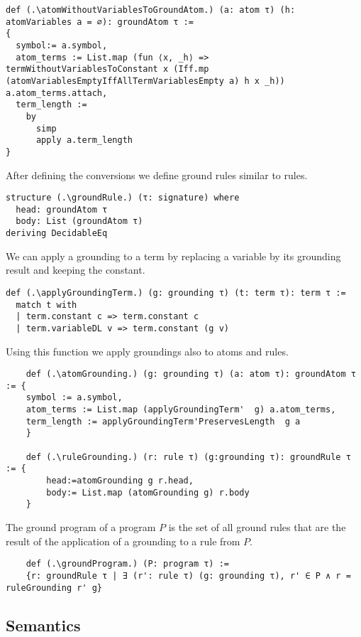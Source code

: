 \begin{lstlisting}
def (.\atomWithoutVariablesToGroundAtom.) (a: atom τ) (h: atomVariables a = ∅): groundAtom τ :=
{
  symbol:= a.symbol,
  atom_terms := List.map (fun ⟨x, _h⟩ => termWithoutVariablesToConstant x (Iff.mp (atomVariablesEmptyIffAllTermVariablesEmpty a) h x _h)) a.atom_terms.attach,
  term_length :=
    by
      simp
      apply a.term_length
}
\end{lstlisting}

After defining the conversions we define ground rules similar to rules.

\begin{lstlisting}
structure (.\groundRule.) (τ: signature) where
  head: groundAtom τ
  body: List (groundAtom τ)
deriving DecidableEq
\end{lstlisting}

We can apply a grounding to a term by replacing a variable by its grounding result and keeping the constant.
\begin{lstlisting}
def (.\applyGroundingTerm.) (g: grounding τ) (t: term τ): term τ :=
  match t with
  | term.constant c => term.constant c
  | term.variableDL v => term.constant (g v)
\end{lstlisting}

Using this function we apply groundings also to atoms and rules. 

\begin{lstlisting}
    def (.\atomGrounding.) (g: grounding τ) (a: atom τ): groundAtom τ := {
    symbol := a.symbol, 
    atom_terms := List.map (applyGroundingTerm'  g) a.atom_terms, 
    term_length := applyGroundingTerm'PreservesLength  g a
    }

    def (.\ruleGrounding.) (r: rule τ) (g:grounding τ): groundRule τ := {
        head:=atomGrounding g r.head, 
        body:= List.map (atomGrounding g) r.body 
    }

\end{lstlisting}

The ground program of a program $P$ is the set of all ground rules that are the result of the application of a grounding to a rule from $P$.

\begin{lstlisting}
    def (.\groundProgram.) (P: program τ) := 
    {r: groundRule τ | ∃ (r': rule τ) (g: grounding τ), r' ∈ P ∧ r = ruleGrounding r' g}
\end{lstlisting}

\subsection{Semantics}

